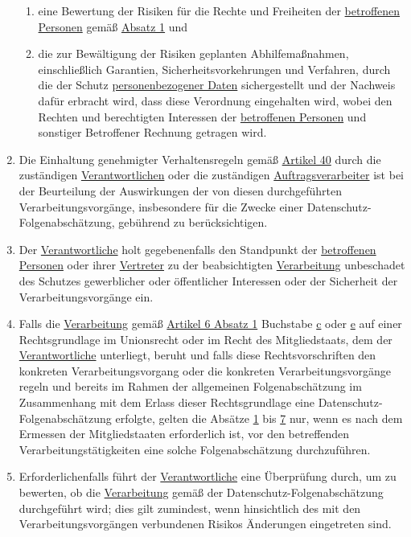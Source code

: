 \begin{enumerate}
\begin{enumerate}
    \item eine Bewertung der Risiken für die Rechte und Freiheiten der \hyperref[itm:04-1]{betroffenen Personen} gemäß \hyperref[itm:35-1]
     {Absatz 1} und
    \label{itm:35-7c}

    \item die zur Bewältigung der Risiken geplanten Abhilfemaßnahmen, einschließlich Garantien, Sicherheitsvorkehrungen
     und Verfahren, durch die der Schutz \hyperref[itm:04-1]{personenbezogener Daten} sichergestellt und der Nachweis dafür erbracht wird,
     dass diese Verordnung eingehalten wird, wobei den Rechten und berechtigten Interessen der \hyperref[itm:04-1]{betroffenen Personen} und
     sonstiger Betroffener Rechnung getragen wird.
    \label{itm:35-7d}

  \end{enumerate}

  \item Die Einhaltung genehmigter Verhaltensregeln gemäß \hyperref[ch:40]{Artikel 40} durch die zuständigen
   \hyperref[itm:04-7]{Verantwortlichen} oder die zuständigen \hyperref[itm:04-8]{Auftragsverarbeiter} ist bei der Beurteilung der Auswirkungen der von diesen
   durchgeführten Verarbeitungsvorgänge, insbesondere für die Zwecke einer Datenschutz-Folgenabschätzung, gebührend zu
   berücksichtigen.
  \label{itm:35-8}

  \item Der \hyperref[itm:04-7]{Verantwortliche} holt gegebenenfalls den Standpunkt der \hyperref[itm:04-1]{betroffenen Personen} oder ihrer \hyperref[itm:04-17]{Vertreter} zu der
   beabsichtigten \hyperref[itm:04-2]{Verarbeitung} unbeschadet des Schutzes gewerblicher oder öffentlicher Interessen oder der Sicherheit
   der Verarbeitungsvorgänge ein.
  \label{itm:35-9}

  \item Falls die \hyperref[itm:04-2]{Verarbeitung} gemäß \hyperref[itm:06-1]{Artikel 6 Absatz 1} Buchstabe \hyperref[itm:06-1c]
   {c} oder \hyperref[itm:06-1e]{e} auf einer Rechtsgrundlage im Unionsrecht oder im Recht des Mitgliedstaats, dem der
   \hyperref[itm:04-7]{Verantwortliche} unterliegt, beruht und falls diese Rechtsvorschriften den konkreten Verarbeitungsvorgang oder die
   konkreten Verarbeitungsvorgänge regeln und bereits im Rahmen der allgemeinen Folgenabschätzung im Zusammenhang mit
   dem Erlass dieser Rechtsgrundlage eine Datenschutz-Folgenabschätzung erfolgte, gelten die Absätze \hyperref
   [itm:35-1]{1} bis \hyperref[itm:35-7]{7} nur, wenn es nach dem Ermessen der Mitgliedstaaten erforderlich ist, vor
   den betreffenden Verarbeitungstätigkeiten eine solche Folgenabschätzung durchzuführen.
  \label{itm:35-10}

  \item Erforderlichenfalls führt der \hyperref[itm:04-7]{Verantwortliche} eine Überprüfung durch, um zu bewerten, ob die \hyperref[itm:04-2]{Verarbeitung} gemäß
   der Datenschutz-Folgenabschätzung durchgeführt wird; dies gilt zumindest, wenn hinsichtlich des mit den
   Verarbeitungsvorgängen verbundenen Risikos Änderungen eingetreten sind.
  \label{itm:35-11}

\end{enumerate}



